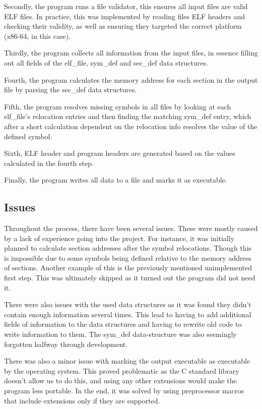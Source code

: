 \documentclass{article}
\begin{document}
Secondly, the program runs a file validator, this ensures all input files are valid ELF files. In practice, this was implemented by reading files ELF headers and checking their validity, as well as ensuring they targeted the correct platform (x86-64, in this case).

Thirdly, the program collects all information from the input files, in essence filling out all fields of the elf\_file, sym\_def and sec\_def data structures.

Fourth, the program calculates the memory address for each section in the output file by parsing the sec\_def data structures.

Fifth, the program resolves missing symbols in all files by looking at each elf\_file's relocation entries and then finding the matching sym\_def entry, which after a short calculation dependent on the relocation info resolves the value of the defined symbol.

Sixth, ELF header and program headers are generated based on the values calculated in the fourth step.

Finally, the program writes all data to a file and marks it as executable.

\subsection{Issues}

Throughout the process, there have been several issues. These were mostly caused by a lack of experience going into the project. For instance, it was initially planned to calculate section addresses after the symbol relocations. Though this is impossible due to some symbols being defined relative to the memory address of sections. Another example of this is the previously mentioned unimplemented first step. This was ultimately skipped as it turned out the program did not need it.

There were also issues with the used data structures as it was found they didn't contain enough information several times. This lead to having to add additional fields of information to the data structures and having to rewrite old code to write information to them. The sym\_def data-structure was also seemingly forgotten halfway through development.

There was also a minor issue with marking the output executable as executable by the operating system. This proved problematic as the C standard library doesn't allow us to do this, and using any other extensions would make the program less portable. In the end, it was solved by using preprocessor macros that include extensions only if they are supported.
\end{document}
